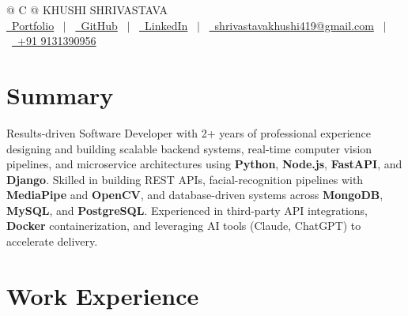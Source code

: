 \documentclass[a4paper,11pt]{article}
\begin{document}
\pagestyle{empty}


\begin{tabularx}{\linewidth}{@{} C @{}}
\Huge{KHUSHI SHRIVASTAVA} \\[8pt]
\href{https://khushishrivastava2002.github.io/Khushi_shrivastava_portfolio/}{\raisebox{-0.05\height}\faGlobe\ Portfolio} \ $|$ \
\href{https://github.com/khushishrivastava2002}{\raisebox{-0.05\height}\faGithub\ GitHub} \ $|$ \
\href{https://www.linkedin.com/in/khushi-shrivastava-a694741b3/}{\raisebox{-0.05\height}\faLinkedin\ LinkedIn} \ $|$ \
\href{mailto:shrivastavakhushi419@gmail.com}{\raisebox{-0.05\height}\faEnvelope \ shrivastavakhushi419@gmail.com} \ $|$ \
\href{tel:+919131390956}{\raisebox{-0.05\height}\faMobile \ +91 9131390956} \\
\end{tabularx}


\section{Summary}
Results-driven Software Developer with 2+ years of professional experience designing and building scalable backend systems, real-time computer vision pipelines, and microservice architectures using \textbf{Python}, \textbf{Node.js}, \textbf{FastAPI}, and \textbf{Django}. Skilled in building REST APIs, facial-recognition pipelines with \textbf{MediaPipe} and \textbf{OpenCV}, and database-driven systems across \textbf{MongoDB}, \textbf{MySQL}, and \textbf{PostgreSQL}. Experienced in third-party API integrations, \textbf{Docker} containerization, and leveraging AI tools (Claude, ChatGPT) to accelerate delivery.


\section{Work Experience}
\end{document}
